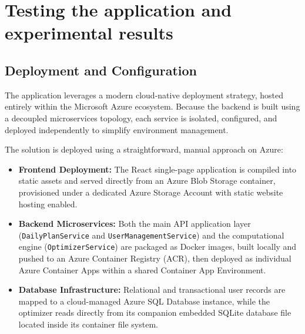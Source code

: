 \chapter{Testing the application and experimental results}

\section{Deployment and Configuration}

The application leverages a modern cloud-native deployment strategy, hosted entirely 
within the Microsoft Azure ecosystem. Because the backend is built using a decoupled 
microservices topology, each service is isolated, configured, and deployed independently 
to simplify environment management.

The solution is deployed using a straightforward, manual approach on Azure:
\begin{itemize}
    \item \textbf{Frontend Deployment:} The React single-page application is compiled into
    static assets and served directly from an Azure Blob Storage container, provisioned
    under a dedicated Azure Storage Account with static website hosting enabled.
    \item \textbf{Backend Microservices:} Both the main API application
    layer (\texttt{DailyPlanService} and \newline\texttt{UserManagementService}) and the
    computational engine (\texttt{OptimizerService}) are packaged as Docker images, built
    locally and pushed to an Azure Container Registry (ACR), then deployed as individual
    Azure Container Apps within a shared Container App Environment.
    \item \textbf{Database Infrastructure:} Relational and transactional user records are 
    mapped to a cloud-managed Azure SQL Database instance, while the optimizer reads 
    directly from its companion embedded SQLite database file located inside its 
    container file system.
\end{itemize}

